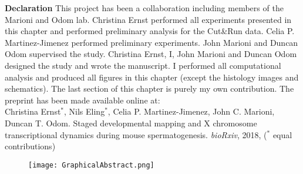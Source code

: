 \vspace*{\fill}

\newpage

\vspace*{\fill}

\begin{Comment}
\textbf{Declaration} This project has been a collaboration including members of the Marioni and Odom lab. Christina Ernst performed all experiments presented in this chapter and performed preliminary analysis for the Cut\&{}Run data. Celia P. Martinez-Jimenez performed preliminary experiments. John Marioni and Duncan Odom supervised the study. Christina Ernst, I, John Marioni and Duncan Odom designed the study and wrote the manuscript. I performed all computational analysis and produced all figures in this chapter (except the histology images and schematics). The last section of this chapter is purely my own contribution. The preprint has been made available online at:\\

Christina Ernst$^\ast$, Nils Eling$^\ast$, Celia P. Martinez-Jimenez, John C. Marioni, Duncan T. Odom. Staged developmental mapping and X chromosome transcriptional dynamics during mouse spermatogenesis. \emph{bioRxiv}, 2018, ($^\ast$ equal contributions)
\end{Comment}

\vspace*{\fill}

\begin{figure}[hb]
\centering    
\texttt{[image: GraphicalAbstract.png]}
\caption*{}
\end{figure}

\vspace*{\fill}


\newpage


\newpage

\newpage


